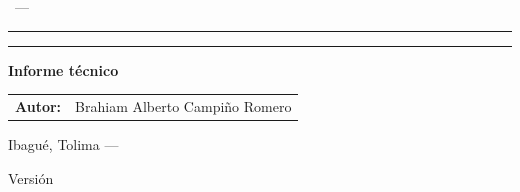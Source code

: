 \begin{titlepage}
  \centering

  {\Large\scshape \universidad\par}
  \vspace{0.2cm}
  {\large \facultad\ --- \programa\par}
  \vspace{0.2cm}
  {\large \asignatura\par}

  \vspace{2.5cm}
  {\color{acento}\rule{\textwidth}{1.2pt}\par}
  \vspace{0.5cm}
  {\huge\bfseries\color{acento} \titulo\par}
  \vspace{0.4cm}
  {\Large \subtitulo\par}
  \vspace{0.5cm}
  {\color{acento}\rule{\textwidth}{1.2pt}\par}

  \vspace{2cm}
  {\large\textbf{Informe técnico}\par}

  \vspace{1.5cm}
  \begin{tabular}{rl}
    \textbf{Autor:} & Brahiam Alberto Campiño Romero \\
  \end{tabular}

  \vfill
  {\large Ibagué, Tolima --- \fecha\par}
  \vspace{0.3cm}
  {\small\color{gris} Versión \versiondoc\par}
\end{titlepage}
